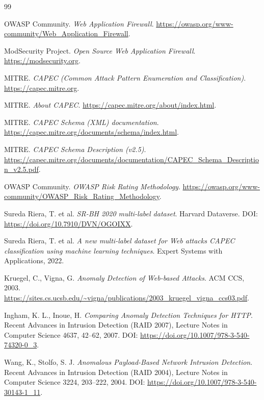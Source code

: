 \documentclass[12pt,oneside]{report}
\begin{document}
\begin{thebibliography}{99}

OWASP Community. \emph{Web Application Firewall}. \url{https://owasp.org/www-community/Web_Application_Firewall}.

ModSecurity Project. \emph{Open Source Web Application Firewall}. \url{https://modsecurity.org}.

MITRE. \emph{CAPEC (Common Attack Pattern Enumeration and Classification)}. \url{https://capec.mitre.org}.

MITRE. \emph{About CAPEC}. \url{https://capec.mitre.org/about/index.html}.

MITRE. \emph{CAPEC Schema (XML) documentation}. \url{https://capec.mitre.org/documents/schema/index.html}.

MITRE. \emph{CAPEC Schema Description (v2.5)}. \url{https://capec.mitre.org/documents/documentation/CAPEC_Schema_Description_v2.5.pdf}.

OWASP Community. \emph{OWASP Risk Rating Methodology}. \url{https://owasp.org/www-community/OWASP_Risk_Rating_Methodology}.

Sureda Riera, T. et al. \emph{SR-BH 2020 multi-label dataset}. Harvard Dataverse.
DOI: \url{https://doi.org/10.7910/DVN/OGOIXX}.

Sureda Riera, T. et al. \emph{A new multi-label dataset for Web attacks CAPEC classification using machine learning techniques}.
Expert Systems with Applications, 2022.

Kruegel, C., Vigna, G. \emph{Anomaly Detection of Web-based Attacks}. ACM CCS, 2003.
\url{https://sites.cs.ucsb.edu/~vigna/publications/2003_kruegel_vigna_ccs03.pdf}.

Ingham, K. L., Inoue, H.
\emph{Comparing Anomaly Detection Techniques for HTTP}.
Recent Advances in Intrusion Detection (RAID 2007), Lecture Notes in Computer Science 4637, 42--62, 2007. DOI: \url{https://doi.org/10.1007/978-3-540-74320-0_3}.

Wang, K., Stolfo, S. J.
\emph{Anomalous Payload-Based Network Intrusion Detection}.
Recent Advances in Intrusion Detection (RAID 2004), Lecture Notes in Computer Science 3224, 203--222, 2004. DOI: \url{https://doi.org/10.1007/978-3-540-30143-1_11}.


\end{thebibliography}
\end{document}
